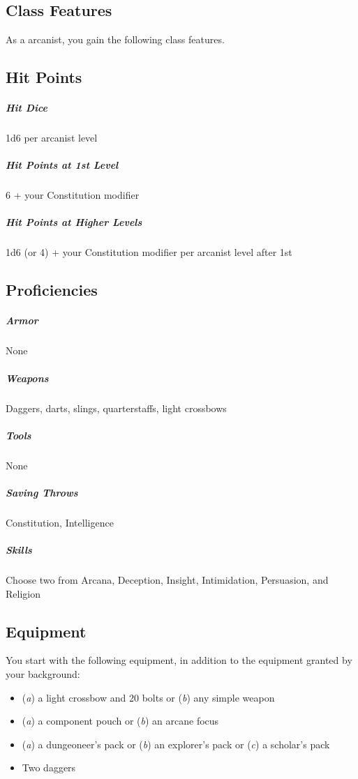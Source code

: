 \subsection{Class Features}

As a arcanist, you gain the following class features.

\subsection{Hit Points}

\subparagraph*{Hit Dice} 1d6 per arcanist level

\subparagraph*{Hit Points at 1st Level} 6 + your Constitution modifier

\subparagraph*{Hit Points at Higher Levels} 1d6 (or 4) + your Constitution modifier per arcanist level after 1st

\subsection{Proficiencies}

\subparagraph*{Armor} None

\subparagraph*{Weapons} Daggers, darts, slings, quarterstaffs, light crossbows

\subparagraph*{Tools} None

\subparagraph*{Saving Throws} Constitution, Intelligence

\subparagraph*{Skills} Choose two from Arcana, Deception, Insight, Intimidation, Persuasion, and Religion

\subsection{Equipment}

You start with the following equipment, in addition to the equipment granted by your background:
\begin{itemize}
\item (\textit{a}) a light crossbow and 20 bolts or (\textit{b}) any simple weapon
\item (\textit{a}) a component pouch or (\textit{b}) an arcane focus
\item (\textit{a}) a dungeoneer's pack or (\textit{b}) an explorer's pack or (\textit{c}) a scholar's pack
\item Two daggers
\end{itemize}

